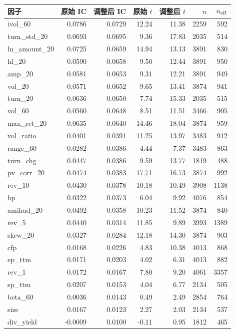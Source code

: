{\small
\begin{longtable}{@{}lrrrrrr@{}}
\toprule
因子 & 原始 IC & 调整后 IC & 原始 $t$ & 调整后 $t$ & $n$ & $n_{\rm eff}$ \\
\midrule
\endhead
ivol\_60 & 0.0786 & 0.0729 & 12.24 & 11.38 & 2259 & 592 \\
turn\_std\_20 & 0.0693 & 0.0695 & 9.36 & 17.83 & 2035 & 514 \\
ln\_amount\_20 & 0.0725 & 0.0659 & 14.94 & 13.13 & 3891 & 830 \\
hl\_20 & 0.0590 & 0.0658 & 9.50 & 12.44 & 3891 & 950 \\
amp\_20 & 0.0581 & 0.0653 & 9.31 & 12.21 & 3891 & 949 \\
vol\_20 & 0.0571 & 0.0652 & 9.65 & 13.41 & 3874 & 941 \\
turn\_20 & 0.0636 & 0.0650 & 7.74 & 15.33 & 2035 & 515 \\
vol\_60 & 0.0560 & 0.0648 & 8.51 & 11.51 & 3466 & 905 \\
max\_ret\_20 & 0.0635 & 0.0640 & 14.46 & 18.04 & 3874 & 959 \\
vol\_ratio & 0.0401 & 0.0391 & 11.25 & 13.97 & 3483 & 912 \\
range\_60 & 0.0282 & 0.0386 & 4.44 & 7.37 & 3483 & 863 \\
turn\_chg & 0.0447 & 0.0386 & 9.59 & 13.77 & 1819 & 488 \\
pv\_corr\_20 & 0.0474 & 0.0383 & 17.71 & 16.73 & 3874 & 992 \\
rev\_10 & 0.0430 & 0.0378 & 10.18 & 10.49 & 3908 & 1138 \\
bp & 0.0322 & 0.0373 & 6.04 & 9.92 & 4076 & 854 \\
amihud\_20 & 0.0492 & 0.0358 & 10.23 & 11.52 & 3874 & 840 \\
rev\_5 & 0.0440 & 0.0314 & 11.85 & 9.89 & 3993 & 1389 \\
skew\_20 & 0.0327 & 0.0284 & 12.18 & 14.30 & 3874 & 903 \\
cfp & 0.0168 & 0.0226 & 4.83 & 10.38 & 4013 & 868 \\
ep\_ttm & 0.0171 & 0.0203 & 4.02 & 6.31 & 4013 & 882 \\
rev\_1 & 0.0172 & 0.0167 & 7.80 & 9.20 & 4061 & 3357 \\
sp\_ttm & 0.0207 & 0.0153 & 4.04 & 6.77 & 2134 & 505 \\
beta\_60 & 0.0036 & 0.0143 & 0.49 & 2.49 & 2854 & 764 \\
size & 0.0167 & 0.0123 & 2.27 & 2.03 & 2134 & 537 \\
div\_yield & -0.0009 & 0.0100 & -0.11 & 0.95 & 1812 & 465 \\

\end{longtable}}
